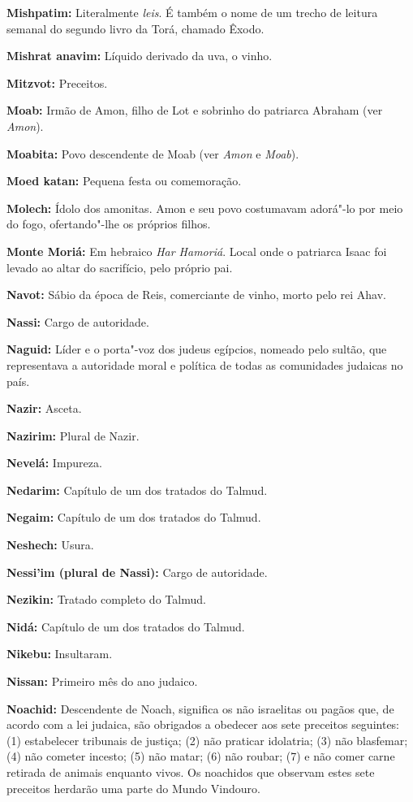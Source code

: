 \begin{hangparas}{.25in}{1}
{\textbf{Mishpatim:} Literalmente \emph{leis}. É também o nome de um trecho de 
leitura semanal do segundo livro da Torá, chamado Êxodo.

\textbf{Mishrat anavim:} Líquido derivado da uva, o vinho.

\textbf{Mitzvot:} Preceitos.

\textbf{Moab:} Irmão de Amon, filho de Lot e sobrinho do patriarca
Abraham (ver \emph{Amon}).

\textbf{Moabita:} Povo descendente de Moab (ver \emph{Amon} e \emph{Moab}).

\textbf{Moed katan:} Pequena festa ou comemoração.

\textbf{Molech:} Ídolo dos amonitas. Amon e seu povo costumavam adorá"-lo por
meio do fogo, ofertando"-lhe os próprios filhos.

\textbf{Monte Moriá:} Em hebraico \emph{Har Hamoriá}. Local 
onde o patriarca Isaac foi
levado ao altar do sacrifício, pelo próprio pai.

\textbf{Navot:} Sábio da época de Reis, comerciante de vinho, morto pelo rei Ahav.

\textbf{Nassi:} Cargo de autoridade.

\textbf{Naguid:} Líder e o porta"-voz dos judeus egípcios,
nomeado pelo sultão, que representava a autoridade moral e política
de todas as comunidades judaicas no país.

\textbf{Nazir:} Asceta.

\textbf{Nazirim:} Plural de Nazir.

\textbf{Nevelá:} Impureza.

\textbf{Nedarim:} Capítulo de um dos tratados do Talmud.

\textbf{Negaim:} Capítulo de um dos tratados do Talmud.

\textbf{Neshech:} Usura.

\textbf{Nessi'im (plural de Nassi):} Cargo de autoridade.

\textbf{Nezikin:} Tratado completo do Talmud.

\textbf{Nidá:} Capítulo de um dos tratados do Talmud.

\textbf{Nikebu:} Insultaram.

\textbf{Nissan:} Primeiro mês do ano judaico.

\textbf{Noachid:} Descendente de Noach, significa os não
israelitas ou pagãos que, de acordo com a lei
judaica, são obrigados a obedecer aos sete preceitos seguintes:
(1) estabelecer tribunais de justiça; (2) não praticar idolatria;
(3) não blasfemar; (4) não cometer incesto; (5) não matar;
(6) não roubar; (7) e não comer carne retirada de animais enquanto vivos. Os noachidos que observam estes sete preceitos herdarão uma parte do Mundo Vindouro.

}
\end{hangparas}
